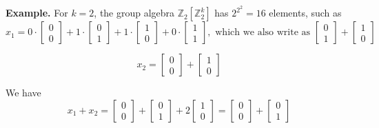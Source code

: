 \begin{mdframed}
\scriptsize{
\noindent
\textbf{Example.} For $k=2$, the group algebra $\mathbb{Z}_2[\mathbb{Z}_2^k]$ has
$2^{2^2}=16$ elements, such as
\[
x_1=
0\cdot
\begin{bmatrix}
0\\
0
\end{bmatrix}
+ 1\cdot
\begin{bmatrix}
0\\
1
\end{bmatrix}
+
1\cdot
\begin{bmatrix}
1\\
0
\end{bmatrix}
+ 0\cdot
\begin{bmatrix}
1\\
1
\end{bmatrix}
, \mbox{ which we also write as }
\begin{bmatrix}
0\\
1
\end{bmatrix}
+
\begin{bmatrix}
1\\
0
\end{bmatrix}
\]


\[
x_2 =
\begin{bmatrix}
0\\
0
\end{bmatrix}
+
\begin{bmatrix}
1\\
0
\end{bmatrix}
\]

We have 
\[
x_1 + x_2 = 
\begin{bmatrix}
0\\
0
\end{bmatrix}
+
\begin{bmatrix}
0\\
1
\end{bmatrix}
+ 2
\begin{bmatrix}
1\\
0
\end{bmatrix}
=
\begin{bmatrix}
0\\
0
\end{bmatrix}
+
\begin{bmatrix}
0\\
1
\end{bmatrix}
\]

}
\end{mdframed}
